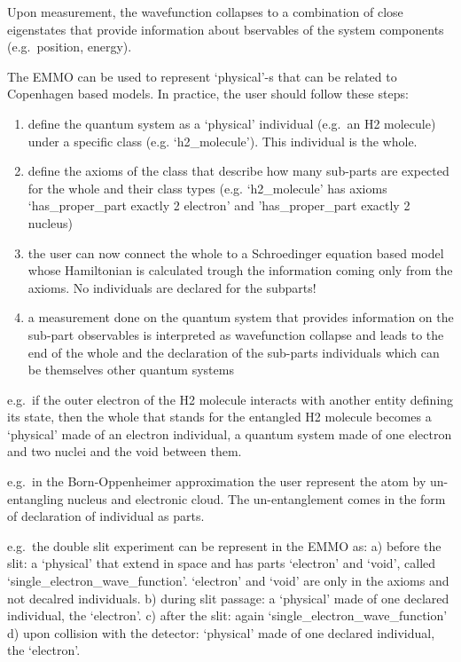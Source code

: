\documentclass[a4paper,]{report}
\begin{document}
Upon measurement, the wavefunction collapses to a combination of close
eigenstates that provide information about bservables of the system
components (e.g.~position, energy).

The EMMO can be used to represent `physical'-s that can be related to
Copenhagen based models. In practice, the user should follow these
steps:

\begin{enumerate}
\def\labelenumi{\alph{enumi})}
\item
  define the quantum system as a `physical' individual (e.g.~an H2
  molecule) under a specific class (e.g. `h2\_molecule'). This
  individual is the whole.
\item
  define the axioms of the class that describe how many sub-parts are
  expected for the whole and their class types (e.g. `h2\_molecule' has
  axioms `has\_proper\_part exactly 2 electron' and 'has\_proper\_part
  exactly 2 nucleus)
\item
  the user can now connect the whole to a Schroedinger equation based
  model whose Hamiltonian is calculated trough the information coming
  only from the axioms. No individuals are declared for the subparts!
\item
  a measurement done on the quantum system that provides information on
  the sub-part observables is interpreted as wavefunction collapse and
  leads to the end of the whole and the declaration of the sub-parts
  individuals which can be themselves other quantum systems
\end{enumerate}

e.g.~if the outer electron of the H2 molecule interacts with another
entity defining its state, then the whole that stands for the entangled
H2 molecule becomes a `physical' made of an electron individual, a
quantum system made of one electron and two nuclei and the void between
them.

e.g.~in the Born-Oppenheimer approximation the user represent the atom
by un-entangling nucleus and electronic cloud. The un-entanglement comes
in the form of declaration of individual as parts.

e.g.~the double slit experiment can be represent in the EMMO as: a)
before the slit: a `physical' that extend in space and has parts
`electron' and `void', called `single\_electron\_wave\_function'.
`electron' and `void' are only in the axioms and not decalred
individuals. b) during slit passage: a `physical' made of one declared
individual, the `electron'. c) after the slit: again
`single\_electron\_wave\_function' d) upon collision with the detector:
`physical' made of one declared individual, the `electron'.
\end{document}
